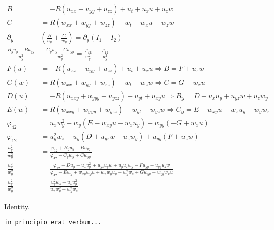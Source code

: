 \documentclass[12pt,a4paper]{article}
\begin{document}
	\begin{align}
	  B &= -R \left(u_{xx} + u_{yy} + u_{zz} \right) + u_t + u_x u + u_z w \\
	  C &= R \left(w_{xx} + w_{yy} + w_{zz} \right) - w_t - w_x u - w_z w \\
	  \partial_y &\left( \frac{B}{u_y} + \frac{C}{w_y} \right) = \partial_y \left(I_1 - I_2 \right) \\
	  \frac{B_y u_y - B u_{yy}}{u_y^2} &+ \frac{C_y w_y - C w_{yy}}{w_y^2} = \frac{\varphi_{42}}{w_y^2} - \frac{\varphi_{12}}{u_y^2} \\
	  F(u) &= -R \left(u_{xx} + u_{yy} + u_{zz} \right) + u_t + u_x u \Rightarrow B = F + u_z w \\
	  G(w) &= R \left(w_{xx} + w_{yy} + w_{zz} \right) - w_t - w_z w \Rightarrow C = G - w_x u \\
	  D(u) &= -R \left(u_{xxy} + u_{yyy} + u_{yzz} \right) + u_{yt} + u_{xy} u \Rightarrow B_y = D + u_x u_y + u_{yz} w + u_z w_y \\
	  E(w) &= R \left(w_{xxy} + w_{yyy} + w_{yzz} \right) - w_{yt} - w_{yz} w \Rightarrow C_y = E - w_{xy} u - w_x u_y - w_y w_z \\
    \varphi_{42} &= u_x w_y^2 + w_y \left( E - w_{xy} u - w_x u_y \right) + w_{yy} \left( -G + w_x u \right) \\
    \varphi_{12} &= u_y^2 w_z - u_y \left( D + u_{yz} w + u_z w_y \right) + u_{yy} \left( F + u_z w \right) \\
	  \frac{u_y^2}{w_y^2} &= \frac{\varphi_{12} + B_y u_y - B u_{yy}}{\varphi_{42} - C_y w_y + C w_{yy}} \\
	  \frac{u_y^2}{w_y^2} &= \frac{\varphi_{12} + D u_y + u_x u_y^2 + u_{yz} u_y w + u_y u_z w_y - F u_{yy} - u_{yy} u_z w }{\varphi_{42} -E w_y + w_{xy} w_y u + w_x w_y u_y + w_y^2 w_z + G w_{yy} - w_{yy} w_x u } \\
	  \frac{u_y^2}{w_y^2} &= \frac{u_y^2 w_z + u_x u_y^2}{u_x w_y^2 + w_y^2 w_z}
	\end{align}

  Identity.

	\begin{flushright}
	\end{flushright}

\begin{verbatim}
in principio erat verbum...
\end{verbatim}

	\addtocontents{}{\noindent\protect\rule{\textwidth}{.2pt}\par}
\end{document}
